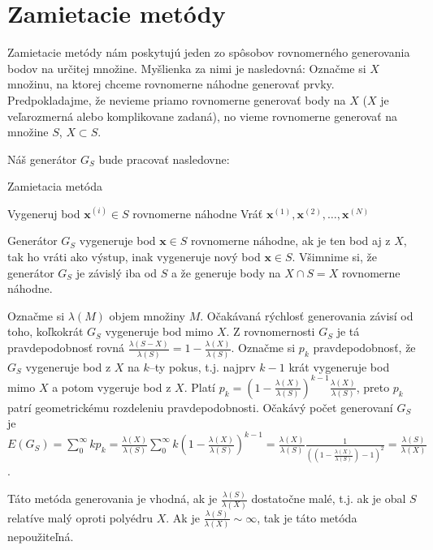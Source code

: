 \section{Zamietacie metódy}

Zamietacie metódy nám poskytujú jeden zo spôsobov rovnomerného generovania bodov na určitej množine.
Myšlienka za nimi je nasledovná: Označme si $X$ množinu, na ktorej chceme rovnomerne náhodne generovať prvky. Predpokladajme, že nevieme priamo rovnomerne generovať body na $X$ ($X$ je veľarozmerná alebo komplikovane zadaná), no vieme rovnomerne generovať na množine $S$, $X \subset S$.

Náš generátor $G_S$ bude pracovať nasledovne:

\begin{algorithm}[H]
	\caption{Zamietacia metóda}
	\label{zamietanie:basic}
	\begin{algorithmic}[1]
			\Repeat Vygeneruj bod $\mathbf x^{(i)} \in S$ rovnomerne náhodne
		\EndFor
		\State Vráť ${\mathbf x^{(1)},\mathbf x^{(2)},\dots,\mathbf x^{(N)}}$
	\end{algorithmic}
\end{algorithm}
Generátor $G_S$ vygeneruje bod $\mathbf x \in S$ rovnomerne náhodne, ak je ten bod aj z $X$, tak ho vráti ako výstup, inak vygeneruje nový bod $\mathbf x \in S$. Všimnime si, že generátor $G_S$ je závislý iba od $S$ a že generuje body na $X \cap S=X$ rovnomerne náhodne.

Označme si $\lambda(M)$ objem množiny $M$. Očakávaná rýchlosť generovania závisí od toho, koľkokrát $G_S$ vygeneruje bod mimo $X$. Z rovnomernosti $G_S$ je tá pravdepodobnosť rovná $\frac{\lambda(S-X)}{\lambda(S)} = 1-\frac{\lambda(X)}{\lambda(S)}$. Označme si $p_k$ pravdepodobnosť, že $G_S$ vygeneruje bod z $X$ na $k$--ty pokus, t.j. najprv $k-1$ krát vygeneruje bod mimo $X$ a potom vygeruje bod z $X$. Platí $p_k= (1-\frac{\lambda(X)}{\lambda(S)})^{k-1}\frac{\lambda(X)}{\lambda(S)}$, preto $p_k$ patrí geometrickému rozdeleniu pravdepodobnosti. Očakávý počet generovaní $G_S$ je $E(G_S)=\sum^{\infty}_{0}kp_k=\frac{\lambda(X)}{\lambda(S)} \sum^{\infty}_{0}k(1-\frac{\lambda(X)}{\lambda(S)})^{k-1}=\frac{\lambda(X)}{\lambda(S)} \frac{1}{((1-\frac{\lambda(X)}{\lambda(S)})-1)^2} = \frac{\lambda(S)}{\lambda(X)}$.

Táto metóda generovania je vhodná, ak je $\frac{\lambda(S)}{\lambda(X)}$ dostatočne malé, t.j. ak je obal $S$ relatíve malý oproti polyédru $X$. Ak je $\frac{\lambda(S)}{\lambda(X)} \sim \infty$, tak je táto metóda nepoužiteľná.

